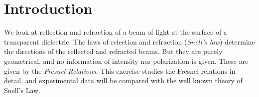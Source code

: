 \section{Introduction}
We look at reflection and refraction of a beam of light at the surface of a transparent dielectric. The laws of relection and refraction (\emph{Snell's law}) determine the directions of the reflected and refracted beams. But they are purely geometrical, and no information of intensity nor polarization is given. These are given by the \emph{Fresnel Relations}. This exercise studies the Fresnel relations in detail, and experimental data will be compared with the well known theory of Snell's Law.
